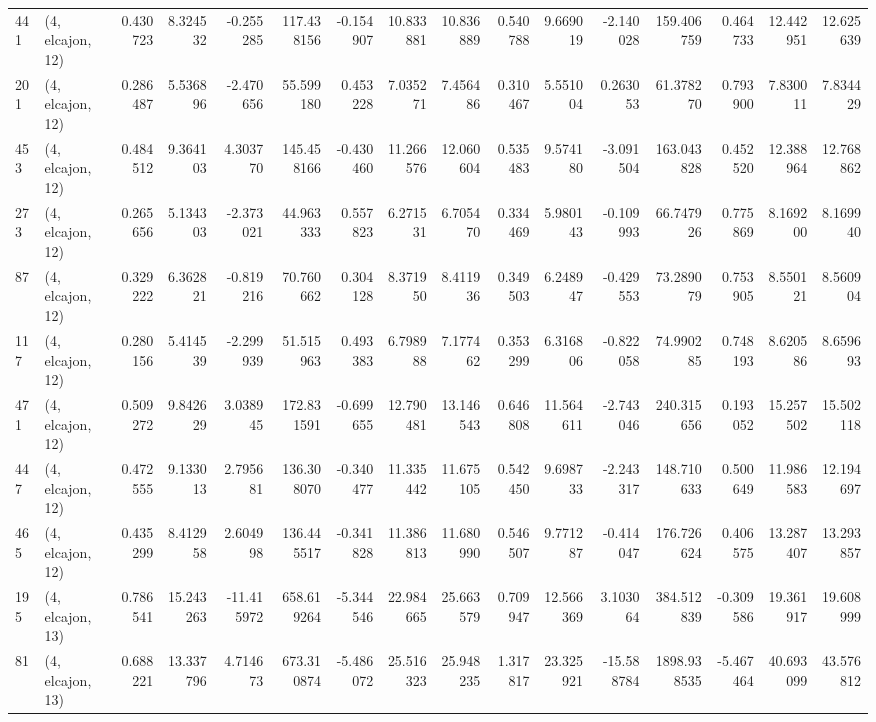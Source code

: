 \begin{tabular}{llrrrrrrrrrrrrrr}
441 &  (4, elcajon, 12) &   0.430723 &   8.324532 &  -0.255285 &   117.438156 &  -0.154907 &  10.833881 &  10.836889 &  0.540788 &   9.669019 &  -2.140028 &    159.406759 &    0.464733 &   12.442951 &   12.625639 \\
201 &  (4, elcajon, 12) &   0.286487 &   5.536896 &  -2.470656 &    55.599180 &   0.453228 &   7.035271 &   7.456486 &  0.310467 &   5.551004 &   0.263053 &     61.378270 &    0.793900 &    7.830011 &    7.834429 \\
453 &  (4, elcajon, 12) &   0.484512 &   9.364103 &   4.303770 &   145.458166 &  -0.430460 &  11.266576 &  12.060604 &  0.535483 &   9.574180 &  -3.091504 &    163.043828 &    0.452520 &   12.388964 &   12.768862 \\
273 &  (4, elcajon, 12) &   0.265656 &   5.134303 &  -2.373021 &    44.963333 &   0.557823 &   6.271531 &   6.705470 &  0.334469 &   5.980143 &  -0.109993 &     66.747926 &    0.775869 &    8.169200 &    8.169940 \\
87  &  (4, elcajon, 12) &   0.329222 &   6.362821 &  -0.819216 &    70.760662 &   0.304128 &   8.371950 &   8.411936 &  0.349503 &   6.248947 &  -0.429553 &     73.289079 &    0.753905 &    8.550121 &    8.560904 \\
117 &  (4, elcajon, 12) &   0.280156 &   5.414539 &  -2.299939 &    51.515963 &   0.493383 &   6.798988 &   7.177462 &  0.353299 &   6.316806 &  -0.822058 &     74.990285 &    0.748193 &    8.620586 &    8.659693 \\
471 &  (4, elcajon, 12) &   0.509272 &   9.842629 &   3.038945 &   172.831591 &  -0.699655 &  12.790481 &  13.146543 &  0.646808 &  11.564611 &  -2.743046 &    240.315656 &    0.193052 &   15.257502 &   15.502118 \\
447 &  (4, elcajon, 12) &   0.472555 &   9.133013 &   2.795681 &   136.308070 &  -0.340477 &  11.335442 &  11.675105 &  0.542450 &   9.698733 &  -2.243317 &    148.710633 &    0.500649 &   11.986583 &   12.194697 \\
465 &  (4, elcajon, 12) &   0.435299 &   8.412958 &   2.604998 &   136.445517 &  -0.341828 &  11.386813 &  11.680990 &  0.546507 &   9.771287 &  -0.414047 &    176.726624 &    0.406575 &   13.287407 &   13.293857 \\
195 &  (4, elcajon, 13) &   0.786541 &  15.243263 & -11.415972 &   658.619264 &  -5.344546 &  22.984665 &  25.663579 &  0.709947 &  12.566369 &   3.103064 &    384.512839 &   -0.309586 &   19.361917 &   19.608999 \\
81  &  (4, elcajon, 13) &   0.688221 &  13.337796 &   4.714673 &   673.310874 &  -5.486072 &  25.516323 &  25.948235 &  1.317817 &  23.325921 & -15.588784 &   1898.938535 &   -5.467464 &   40.693099 &   43.576812 \\

\end{tabular}
